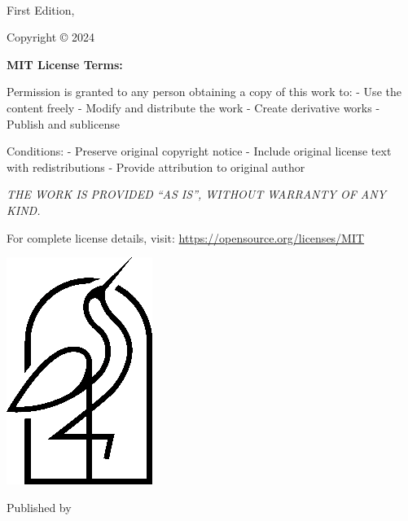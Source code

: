 {\small
\setlength{\parindent}{0em}\setlength{\parskip}{1em}
~
\vfill

First Edition, \editionyear{}

Copyright \copyright{} 2024 \authorname

{\bfseries MIT License Terms:}

Permission is granted to any person obtaining a copy of this work to:
- Use the content freely
- Modify and distribute the work
- Create derivative works
- Publish and sublicense

Conditions:
- Preserve original copyright notice
- Include original license text with redistributions
- Provide attribution to original author

{\itshape THE WORK IS PROVIDED ``AS IS'', WITHOUT WARRANTY OF ANY KIND.}

For complete license details, visit:
\url{https://opensource.org/licenses/MIT}

\ifx\isbn\undefined\else\if\relax\detokenize\expandafter{\isbn}\relax{}\fi\fi

\includegraphics[width=0.07\linewidth]{frontmatter/logo-black.png}

Published by \publisher{}
}
